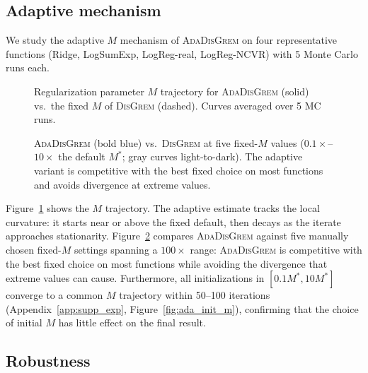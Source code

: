 \documentclass[review,onefignum,onetabnum]{siamart171218}
\begin{document}
	\FloatBarrier
	\subsection{Adaptive mechanism}\label{ssec:ada}
	
	We study the adaptive $M$ mechanism of \textsc{AdaDisGrem} on four
	representative functions (Ridge, LogSumExp, LogReg-real, LogReg-NCVR)
	with 5 Monte Carlo runs each.

	\begin{figure}[htbp]
		\centering
		\caption{Regularization parameter $M$ trajectory for \textsc{AdaDisGrem}
			(solid) vs.\ the fixed $M$ of \textsc{DisGrem} (dashed).
			Curves averaged over 5 MC runs.}
		\label{fig:ada_trajectory}
	\end{figure}

	\begin{figure}[htbp]
		\centering
		\caption{\textsc{AdaDisGrem} (bold blue) vs.\ \textsc{DisGrem}
			at five fixed-$M$ values
			($0.1\times$--$10\times$ the default $M^*$; gray curves
			light-to-dark).
			The adaptive variant is competitive with the best fixed
			choice on most functions and avoids divergence at extreme values.}
		\label{fig:ada_vs_fixed}
	\end{figure}

	Figure~\ref{fig:ada_trajectory} shows the $M$ trajectory.
	The adaptive estimate tracks the local curvature: it starts near
	or above the fixed default, then decays as the iterate approaches
	stationarity.
	Figure~\ref{fig:ada_vs_fixed} compares \textsc{AdaDisGrem} against
	five manually chosen fixed-$M$ settings spanning a $100\times$ range:
	\textsc{AdaDisGrem} is competitive with the best fixed choice on
	most functions while avoiding the divergence that extreme values
	can cause.
	Furthermore, all initializations in $[0.1M^*,10M^*]$
	converge to a common $M$ trajectory within 50--100 iterations
	(Appendix~\ref{app:supp_exp}, Figure~\ref{fig:ada_init_m}),
	confirming that the choice of initial $M$ has little effect
	on the final result.
	
	\FloatBarrier
	\subsection{Robustness}\label{ssec:robust}
	
\end{document}
